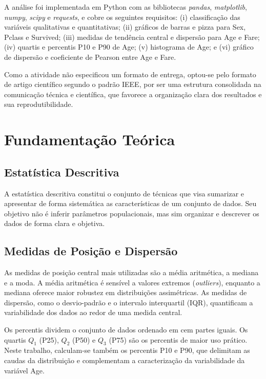 \documentclass[conference]{IEEEtran}
\begin{document}
A análise foi implementada em Python com as bibliotecas \textit{pandas},
\textit{matplotlib}, \textit{numpy}, \textit{scipy} e \textit{requests},
e cobre os seguintes requisitos: (i) classificação das variáveis qualitativas
e quantitativas; (ii) gráficos de barras e pizza para Sex, Pclass e
Survived; (iii) medidas de tendência central e dispersão para Age e Fare;
(iv) quartis e percentis P10 e P90 de Age; (v) histograma de Age; e
(vi) gráfico de dispersão e coeficiente de Pearson entre Age e Fare.

Como a atividade não especificou um formato de entrega, optou-se pelo
formato de artigo científico segundo o padrão IEEE, por ser uma estrutura
consolidada na comunicação técnica e científica, que favorece a organização
clara dos resultados e sua reprodutibilidade.

\section{Fundamentação Teórica}

\subsection{Estatística Descritiva}

A estatística descritiva constitui o conjunto de técnicas que visa sumarizar
e apresentar de forma sistemática as características de um conjunto de dados.
Seu objetivo não é inferir parâmetros populacionais, mas sim organizar e
descrever os dados de forma clara e objetiva.

\subsection{Medidas de Posição e Dispersão}

As medidas de posição central mais utilizadas são a média aritmética,
a mediana e a moda. A média aritmética é sensível a valores extremos
(\textit{outliers}), enquanto a mediana oferece maior robustez em
distribuições assimétricas. As medidas de dispersão, como o desvio-padrão e
o intervalo interquartil (IQR), quantificam a variabilidade dos dados ao
redor de uma medida central.

Os percentis dividem o conjunto de dados ordenado em cem partes iguais.
Os quartis $Q_1$ (P25), $Q_2$ (P50) e $Q_3$ (P75) são os percentis de maior
uso prático. Neste trabalho, calculam-se também os percentis P10 e P90,
que delimitam as caudas da distribuição e complementam a caracterização
da variabilidade da variável Age.
\end{document}
